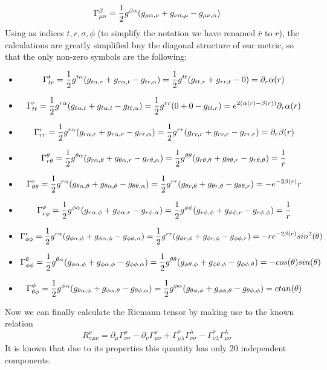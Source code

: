 \documentclass[]{article}
\theoremstyle{definition}
\theoremstyle{Theorem}
\theoremstyle{definition}
\theoremstyle{definition}
\theoremstyle{definition}
\begin{document}
$$\Gamma_{\mu\nu}^\beta={1\over 2}g^{\beta\alpha}(g_{\mu\alpha,\nu}+g_{\nu\alpha,\mu}-g_{\mu\nu,\alpha})$$
Using as indices ${t,r,\sigma,\phi}$ (to simplify the notation we have renamed $\bar{r}$ to $r$), the calculations are greatly simplified bny the diagonal structure of our metric, so that the only non-zero symbols are the following:\\
\begin{itemize}
	\item $$\Gamma_{tr}^t={1\over 2}g^{t\alpha}(g_{t\alpha,r}+g_{r\alpha,t}-g_{tr,\alpha})={1\over 2}g^{tt}(g_{tt,r}+g_{rr,t}-0)=\partial_r\alpha(r)$$
	\item $$\Gamma_{tt}^r={1\over 2}g^{r\alpha}(g_{t\alpha,t}+g_{t\alpha,t}-g_{tt,\alpha})={1\over 2}g^{rr}(0+0-g_{tt,r})=e^{2(\alpha(r)-\beta(r))}\partial_r\alpha(r)$$
	\item $$\Gamma_{rr}^r={1\over 2}g^{r\alpha}(g_{r\alpha,r}+g_{r\alpha,r}-g_{rr,\alpha})={1\over 2}g^{rr}(g_{rr,r}+g_{rr,r}-g_{rr,r})=\partial_r\beta(r)$$
	\item $$\Gamma_{r\theta}^\theta={1\over 2}g^{\theta\alpha}(g_{r\alpha,\theta}+g_{\theta\alpha,r}-g_{r\theta,\alpha})={1\over 2}g^{\theta\theta}(g_{r\theta,\theta}+g_{\theta\theta,r}-g_{r\theta,\theta})={1\over r}$$
	\item $$\Gamma_{\theta\theta}^r={1\over 2}g^{r\alpha}(g_{\theta\alpha,\theta}+g_{\theta\alpha,\theta}-g_{\theta\theta,\alpha})={1\over 2}g^{rr}(g_{\theta r,\theta}+g_{\theta r,\theta}-g_{\theta\theta,r})=-e^{-2\beta(r)}r$$
	\item $$\Gamma_{r\phi}^\phi={1\over 2}g^{\phi\alpha}(g_{r\alpha,\phi}+g_{\phi\alpha,r}-g_{r\phi,\alpha})={1\over 2}g^{\phi\phi}(g_{r\phi,\phi}+g_{\phi\phi,r}-g_{r\phi,\phi})={1\over r}$$
	\item $$\Gamma_{\phi\phi}^r={1\over 2}g^{r\alpha}(g_{\phi\alpha,\phi}+g_{\phi\alpha,\phi}-g_{\phi\phi,\alpha})={1\over 2}g^{rr}(g_{\phi r,\phi}+g_{\phi r,\phi}-g_{\phi\phi,r})=-re^{-2\beta(r)}sin^2(\theta)$$
	\item $$\Gamma_{\phi\phi}^\theta={1\over 2}g^{\theta\alpha}(g_{\phi\alpha,\phi}+g_{\phi\alpha,\phi}-g_{\phi\phi,\alpha})={1\over 2}g^{\theta\theta}(g_{\phi\theta,\phi}+g_{\phi\theta,\phi}-g_{\phi\phi,\theta})=-cos(\theta)sin(\theta)$$
	\item $$\Gamma_{\theta\phi}^\phi={1\over 2}g^{\phi\alpha}(g_{\theta\alpha,\phi}+g_{\phi\alpha,\theta}-g_{\theta\phi,\alpha})={1\over 2}g^{\phi\alpha}(g_{\theta\phi,\phi}+g_{\phi\phi,\theta}-g_{\theta\phi,\phi})=ctan(\theta)$$
\end{itemize}
Now we can finally calculate the Riemann tensor by making use to the known relation 
$$R^\rho_{\sigma\mu\nu}=\partial_\mu\Gamma^\rho_{\nu\sigma}-\partial_\nu\Gamma^\rho_{\mu\sigma}+\Gamma^\rho_{\mu\lambda}\Gamma^\lambda_{\nu\sigma}-\Gamma^\rho_{\nu\lambda}\Gamma^\lambda_{\mu\sigma}$$ 
It is known that due to its properties this quantity has only 20 independent components.
\end{document}
